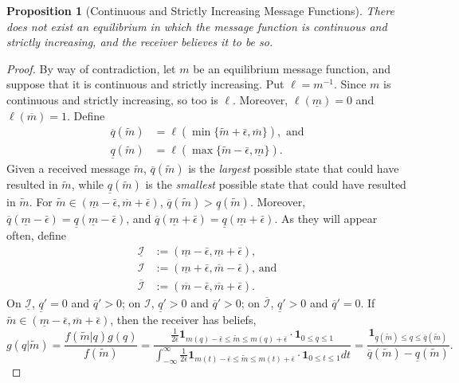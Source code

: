 \documentclass[12pt]{article}
\newtheorem{proposition}{Proposition}
\begin{document}
\begin{proposition}[Continuous and Strictly Increasing Message Functions]
There does not exist an equilibrium in which the message function is continuous and strictly increasing, and the receiver believes it to be so.
\end{proposition}
\begin{proof}
By way of contradiction, let $m$ be an equilibrium message function, and suppose that it is continuous and strictly increasing. Put $\ell=m^{-1}$. Since $m$ is continuous and strictly increasing, so too is $\ell$. Moreover, $\ell(\underline{m})=0$ and $\ell(\overline{m})=1$. Define 
\begin{align}
\overline{q}(\tilde{m})&=\ell(\min\{\tilde{m}+\bar{\epsilon},\overline{m}\}),\text{ and}\\
\underline{q}(\tilde{m})&=\ell(\max\{\tilde{m}-\bar{\epsilon},\underline{m}\}).
\end{align} 
Given a received message $\tilde{m}$, $\overline{q}(\tilde{m})$ is the \textit{largest} possible state that could have resulted in $\tilde{m}$, while $\underline{q}(\tilde{m})$ is the \textit{smallest} possible state that could have resulted in $\tilde{m}$. For $\tilde{m}\in(\underline{m}-\bar{\epsilon},\overline{m}+\bar{\epsilon})$, $\overline{q}(\tilde{m})>\underline{q}(\tilde{m})$. Moreover, $\overline{q}(\underline{m}-\bar{\epsilon})=\underline{q}(\underline{m}-\bar{\epsilon})$, and $\overline{q}(\underline{m}+\bar{\epsilon})=\underline{q}(\underline{m}+\bar{\epsilon})$. As they will appear often, define 
\begin{align}
\underline{\mathcal{I}}&:=(\underline{m}-\bar{\epsilon},\underline{m}+\bar{\epsilon})\text{,}\\
\mathcal{I}&:=(\underline{m}+\bar{\epsilon},\overline{m}-\bar{\epsilon})\text{, and}\\
\overline{\mathcal{I}}&:=(\overline{m}-\bar{\epsilon},\overline{m}+\bar{\epsilon}).
\end{align}
On $\underline{\mathcal{I}}$, $\underline{q}'=0$ and $\overline{q}'>0$; on $\mathcal{I}$, $\underline{q}'>0$ and $\overline{q}'>0$; on $\overline{\mathcal{I}}$, $\underline{q}'>0$ and $\overline{q}'=0$. If $\tilde{m}\in(\underline{m}-\bar{\epsilon},\overline{m}+\bar{\epsilon})$, then the receiver has beliefs, 
\begin{equation}
g(q|\tilde{m})=\frac{f(\tilde{m}|q)g(q)}{f(\tilde{m})}=\frac{\frac{1}{2\bar{\epsilon}}\mathbf{1}_{m(q)-\bar{\epsilon}\leq\tilde{m}\leq m(q)+\bar{\epsilon}}\cdot\mathbf{1}_{0\leq q\leq 1}}{\int_{-\infty}^{\infty}{\frac{1}{2\bar{\epsilon}}\mathbf{1}_{m(t)-\bar{\epsilon}\leq\tilde{m}\leq m(t)+\bar{\epsilon}}\cdot\mathbf{1}_{0\leq t\leq 1}}dt}=\frac{\mathbf{1}_{\underline{q}(\tilde{m})\leq q\leq\overline{q}(\tilde{m})}}{\overline{q}(\tilde{m})-\underline{q}(\tilde{m})}.

\end{equation}
\end{proof}
\end{document}
